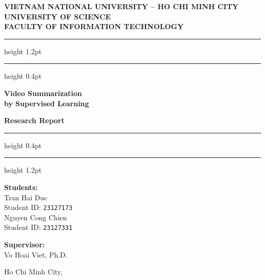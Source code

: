 \documentclass[12pt, a4paper]{report}
\begin{document}
\begin{titlepage}
\thispagestyle{empty}
\begin{center}

  {\large\textbf{VIETNAM NATIONAL UNIVERSITY -- HO CHI MINH CITY}}\\[4pt]
  {\large\textbf{UNIVERSITY OF SCIENCE}}\\[4pt]
  {\large\textbf{FACULTY OF INFORMATION TECHNOLOGY}}

  \vspace{1.5cm}
  \hrule height 1.2pt
  \vspace{0.4cm}
  \hrule height 0.4pt
  \vspace{1.5cm}


  {\color{vnuBlue}\Huge\bfseries
    Video Summarization\\[8pt]
    by Supervised Learning
  }

  \vspace{0.8cm}
  {\Large\bfseries Research Report}

  \vspace{0.5cm}
  \hrule height 0.4pt
  \vspace{0.4cm}
  \hrule height 1.2pt
  \vspace{1.8cm}

  \begin{minipage}{0.48\textwidth}
    \raggedright
    \textbf{Students:}\\[4pt]
    \quad Tran Hai Duc\\
    \quad Student ID: \texttt{23127173}\\[6pt]
    \quad Nguyen Cong Chien\\
    \quad Student ID: \texttt{23127331}
  \end{minipage}
  \hfill
  \begin{minipage}{0.48\textwidth}
    \raggedleft
    \textbf{Supervisor:}\\[4pt]
    Vo Hoai Viet, Ph.D.
  \end{minipage}

  \vfill

  {\large Ho Chi Minh City, \the\year}

\end{center}
\end{titlepage}
\end{document}
